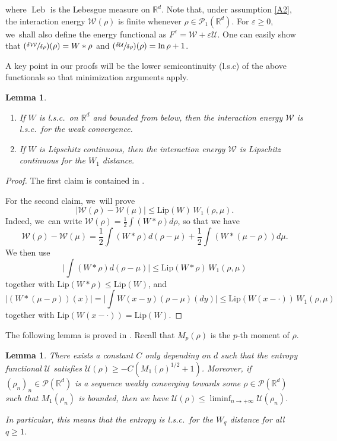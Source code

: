 \documentclass[JEP,XML,SOM,Unicode, NoFloatCountersInSection,published]{cedram}
\newcommand{\Psfrac}[2]{(\sfrac{#1}{#2})}
\DeclareMathOperator{\Leb}{Leb}
\def\RR{\mathbb{R}}
\def\eps{\varepsilon}
\def\calP{{\mathcal P}}
\def\calU{{\mathcal U}}
\def\calW{{\mathcal W}}
\theoremstyle{plain}
\newtheorem{lemma}[theorem]{Lemma}
\theoremstyle{definition}
\begin{document}
where $\Leb$ is the Lebesgue measure on $\RR^d$. Note that, under assumption \eqref{A2}, the interaction energy $\calW(\rho)$ is finite whenever $\rho \in \calP_1(\RR^d)$. For $\eps \geq 0$, we~shall also define the energy functional as $F^\eps = \calW + \eps \calU$. One can easily show that $\Psfrac{\delta \calW}{\delta \rho}(\rho) = W * \rho$ and $\Psfrac{\delta \calU}{\delta \rho}(\rho) = \ln \rho + 1$.

A key point in our proofs will be the lower semicontinuity (l.s.c) of the above functionals so that minimization arguments apply.

\skpt
\begin{lemma}\label{lemma:W_lsc}
\begin{enumerate}
\item If $W$ is l.s.c.\ on $\RR^d$ and bounded from below, then the interaction energy $\calW$ is l.s.c.\ for the weak convergence.
\item If $W$ is Lipschitz continuous, then the interaction energy $\calW$ is Lipschitz continuous for the $W_1$ distance.
\end{enumerate}
\end{lemma}
\begin{proof}
The first claim is contained in \cite[Prop.\,7.2]{otam15}.

For the second claim, we~will prove
\[
|\calW(\rho)-\calW(\mu)|\leq \mathrm{Lip}(W)\,W_1(\rho,\mu).
\]
Indeed, we~can write $\calW(\rho)=\frac12 \int (W*\rho)d\rho$, so that we have
\[
\calW(\rho)-\calW(\mu)=\frac12 \int(W*\rho)d(\rho-\mu)+\frac12\int(W*(\mu-\rho))d\mu.
\]
We then use
\[
\biggl|\int(W*\rho)d(\rho-\mu)\biggr|\leq\mathrm{Lip}(W*\rho)\,W_1(\rho,\mu)
\]
together with $\mathrm{Lip}(W*\rho)\leq \mathrm{Lip}(W)$, and
\[
|(W*(\mu-\rho))(x)|=\biggl|\int W(x-y)(\rho-\mu)(dy)\biggr|\leq \mathrm{Lip}(W(x-\cdot))\,W_1(\rho,\mu)
\]
together with $\mathrm{Lip}(W(x-\cdot))=\mathrm{Lip}(W)$.
\end{proof}

The following lemma is proved in \cite[Prop.\,2.1]{moment}. Recall that $M_p(\rho)$ is the $p$-th moment of $\rho$.
\begin{lemma}\label{lemma:U_lsc}
There exists a constant $C$ only depending on $d$ such that the entropy functional $\calU$ satisfies $\calU(\rho)\geq -C(M_1(\rho)^{1/2}+1)$. Moreover, if
$(\rho_n)_n \in \calP(\RR^d)$ is a sequence weakly converging towards some $\rho \in \calP(\RR^d)$ such that $M_1(\rho_n)$ is bounded, then we have $\calU(\rho) \leq \liminf_{n \to +\infty} \calU(\rho_n)$.

In particular, this means that the entropy is l.s.c.\ for the $W_q$ distance for all $q \geq 1$.
\end{lemma}
\end{document}
